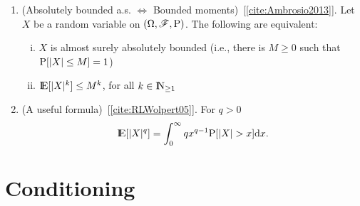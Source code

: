 \documentclass[a4paper,10pt]{article}
\begin{document}
\begin{enumerate}
 \item (Absolutely bounded a.s. $\Leftrightarrow$ Bounded moments)~[\ref{cite:Ambrosio2013}].
	Let $X$ be a random variable on $(\Omega,\mathscr{F},\mathrm{P})$. The following are equivalent:
	\begin{enumerate}[i.]
	  \item $X$ is almost surely absolutely bounded (i.e., there is $M\geq 0$ such that $\mathrm{P}[|X|\leq M]=1$)
	  \item $\E[|X|^k]\leq M^k$, for all $k\in \N_{\geq 1}$
	\end{enumerate}

 \item (A useful formula)~[\ref{cite:RLWolpert05}]. For $q>0$
 \[
  \E[|X|^q] = \int_0^\infty q x^{q-1} \prob[|X|>x]\d x.
 \]	

\end{enumerate}


\section{Conditioning}
\end{document}
